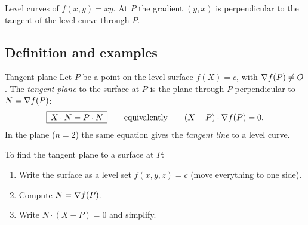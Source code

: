 \begin{center}

{\small\color{navy} Level curves of $f(x,y)=xy$. At $P$ the gradient $(y,x)$ is
perpendicular to the tangent of the level curve through $P$.}
\end{center}

\subsection{Definition and examples}

\begin{definition}{Tangent plane}
Let $P$ be a point on the level surface $f(X)=c$, with $\nabla f(P)\neq O$. The
\emph{tangent plane} to the surface at $P$ is the plane through $P$ perpendicular to
$N=\nabla f(P)$:
\[
 \boxed{\,X\cdot N=P\cdot N\,}\qquad\text{equivalently}\qquad (X-P)\cdot\nabla f(P)=0 .
\]
In the plane ($n=2$) the same equation gives the \emph{tangent line} to a level curve.
\end{definition}

\begin{recipe}
To find the tangent plane to a surface at $P$:
\begin{enumerate}
  \item Write the surface as a level set $f(x,y,z)=c$ (move everything to one side).
  \item Compute $N=\nabla f(P)$.
  \item Write $N\cdot(X-P)=0$ and simplify.
\end{enumerate}
\end{recipe}

